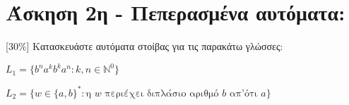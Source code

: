 \section{Άσκηση 2η - Πεπερασμένα αυτόματα:}
\label{sec:Exercise_2}
\doublespacing

[30\%] Κατασκευάστε αυτόματα στοίβας για τις παρακάτω γλώσσες:

\bm{\textcolor{blue}{(α)}} $L_1 = \{b^n a^k b^k a^n : k, n \in  \mathbb{N}^0 \}$

\bm{\textcolor{blue}{(β)}} $L_2 = \{w \in \{a, b\}^* :  \text{η } w \text{ περιέχει διπλάσιο αριθμό } b
\text{ απ'ότι } a\}$
\clearpage